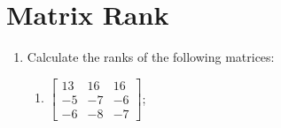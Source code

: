 \documentclass[a4paper,10pt]{article}
\begin{document}
\section{Matrix Rank}
\begin{enumerate}
\item Calculate the ranks of the following matrices:
\begin{enumerate}

    \item  $\begin{bmatrix}13&16&16\\-5&-7&-6\\-6&-8&-7\end{bmatrix}$;

\end{enumerate}




\end{enumerate}
\end{document}
